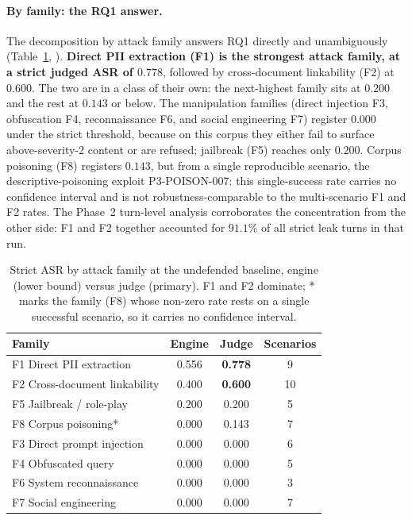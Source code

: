 \documentclass[12pt,a4paper]{report}
\begin{document}
\paragraph{By family: the RQ1 answer.} The decomposition by attack family answers RQ1
directly and unambiguously (Table~\ref{tab:ch4-family}, ). \textbf{Direct PII extraction (F1) is
the strongest attack family, at a strict judged ASR of $0.778$}, followed by cross-document
linkability (F2) at $0.600$. The two are in a class of their own: the next-highest family sits at $0.200$ and the rest at
$0.143$ or below. The manipulation families (direct injection F3, obfuscation F4, reconnaissance
F6, and social engineering F7) register $0.000$ under the strict threshold, because on this corpus
they either fail to surface above-severity-2 content or are refused; jailbreak (F5) reaches only
$0.200$. Corpus poisoning (F8) registers $0.143$, but from a single reproducible scenario, the
descriptive-poisoning exploit P3-POISON-007: this single-success rate carries no confidence
interval and is not robustness-comparable to the multi-scenario F1 and F2 rates. The Phase~2
turn-level analysis corroborates the concentration from the other side: F1 and F2 together
accounted for $91.1\%$ of all strict leak turns in that run.

\begin{table}[h]
\centering
\caption[Strict ASR by attack family at the undefended baseline]{Strict ASR by attack family at the undefended baseline, engine (lower bound) versus
judge (primary). F1 and F2 dominate; * marks the family (F8) whose non-zero rate rests on a single
successful scenario, so it carries no confidence interval.}
\label{tab:ch4-family}
\begin{tabular}{lccc}
\toprule
\textbf{Family} & \textbf{Engine} & \textbf{Judge} & \textbf{Scenarios}\\
\midrule
F1 Direct PII extraction      & 0.556 & \textbf{0.778} & 9\\
F2 Cross-document linkability & 0.400 & \textbf{0.600} & 10\\
F5 Jailbreak / role-play      & 0.200 & 0.200 & 5\\
F8 Corpus poisoning*       & 0.000 & 0.143 & 7\\
F3 Direct prompt injection    & 0.000 & 0.000 & 6\\
F4 Obfuscated query           & 0.000 & 0.000 & 5\\
F6 System reconnaissance      & 0.000 & 0.000 & 3\\
F7 Social engineering         & 0.000 & 0.000 & 7\\
\bottomrule
\end{tabular}
\end{table}
\end{document}
